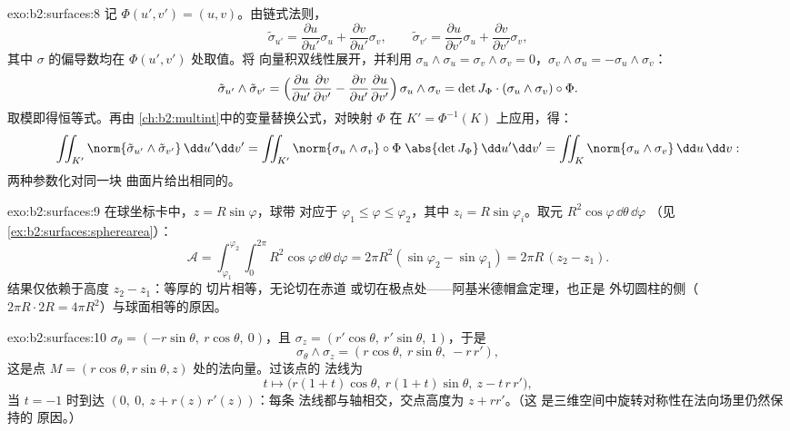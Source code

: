 \begin{solution}{exo:b2:surfaces:8}
记 $\Phi(u', v') = (u, v)$。由链式法则，
\[
\tilde\sigma_{u'} = \frac{\partial u}{\partial u'}\sigma_u
+ \frac{\partial v}{\partial u'}\sigma_v,
\qquad
\tilde\sigma_{v'} = \frac{\partial u}{\partial v'}\sigma_u
+ \frac{\partial v}{\partial v'}\sigma_v ,
\]
其中 $\sigma$ 的偏导数均在 $\Phi(u',v')$ 处取值。将
向量积双线性展开，并利用 $\sigma_u \wedge \sigma_u =
\sigma_v \wedge \sigma_v = 0$，$\sigma_v \wedge \sigma_u =
-\sigma_u \wedge \sigma_v$：
\[
\tilde\sigma_{u'} \wedge \tilde\sigma_{v'}
= \Bigl(\frac{\partial u}{\partial u'}
\frac{\partial v}{\partial v'}
- \frac{\partial v}{\partial u'}
\frac{\partial u}{\partial v'}\Bigr)\,
\sigma_u \wedge \sigma_v
= \det J_\Phi \cdot (\sigma_u \wedge \sigma_v)\circ\Phi .
\]
取模即得恒等式。再由
\cref{ch:b2:multint}中的变量替换公式，对映射 $\Phi$ 在 $K' =
\Phi^{-1}(K)$ 上应用，得：
\[
\iint_{K'} \norm{\tilde\sigma_{u'} \wedge \tilde\sigma_{v'}}
\,\dd u'\dd v'
= \iint_{K'} \norm{\sigma_u \wedge \sigma_v}\circ\Phi\;
\abs{\det J_\Phi}\,\dd u'\dd v'
= \iint_K \norm{\sigma_u \wedge \sigma_v}\,\dd u\,\dd v :
\]
两种参数化对同一块
曲面片给出相同的。
\end{solution}

\begin{solution}{exo:b2:surfaces:9}
在球坐标卡中，$z = R\sin\varphi$，球带
对应于 $\varphi_1 \leq \varphi \leq \varphi_2$，其中
$z_i = R\sin\varphi_i$。取元
$R^2\cos\varphi\,\dd\theta\,\dd\varphi$
（见\cref{ex:b2:surfaces:spherearea}）：
\[
\mathcal A = \int_{\varphi_1}^{\varphi_2}\!\!\int_0^{2\pi}
R^2\cos\varphi\,\dd\theta\,\dd\varphi
= 2\pi R^2(\sin\varphi_2 - \sin\varphi_1)
= 2\pi R\,(z_2 - z_1) .
\]
结果仅依赖于高度 $z_2 - z_1$：等厚的
切片相等，无论切在赤道
或切在极点处——阿基米德帽盒定理，也正是
外切圆柱的侧（$2\pi R \cdot
2R = 4\pi R^2$）与球面相等的原因。
\end{solution}

\begin{solution}{exo:b2:surfaces:10}
$\sigma_\theta = (-r\sin\theta,\ r\cos\theta,\ 0)$，且
$\sigma_z = (r'\cos\theta,\ r'\sin\theta,\ 1)$，于是
\[
\sigma_\theta \wedge \sigma_z
= (r\cos\theta,\ r\sin\theta,\ -r\,r') ,
\]
这是点 $M = (r\cos\theta, r\sin\theta, z)$ 处的法向量。过该点的
法线为
\[
t \mapsto \bigl(r(1 + t)\cos\theta,\ r(1 + t)\sin\theta,\
z - t\,r\,r'\bigr),
\]
当 $t = -1$ 时到达 $(0,\ 0,\ z + r(z)\,r'(z))$：每条
法线都与轴相交，交点高度为 $z + rr'$。（这
是三维空间中旋转对称性在法向场里仍然保持的
原因。）
\end{solution}

